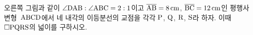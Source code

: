 \noindent\begin{minipage}[t]{0.58\linewidth}\vspace{0pt}\raggedright 오른쪽 그림과 같이 $\angle\mathrm{DAB}:\angle\mathrm{ABC}=2:1$이고 $\overline{\mathrm{AB}}=8\,\mathrm{cm}$, $\overline{\mathrm{BC}}=12\,\mathrm{cm}$인 평행사변형~$\mathrm{ABCD}$에서 네 내각의 이등분선의 교점을 각각 $\mathrm{P}$, $\mathrm{Q}$, $\mathrm{R}$, $\mathrm{S}$라 하자. 이때 $\square\mathrm{PQRS}$의 넓이를 구하시오.\end{minipage}\hfill\begin{minipage}[t]{0.4\linewidth}\vspace{0pt}\centering \resizebox{\ifdim\width>\linewidth\linewidth\else\width\fi}{!}{}\end{minipage}\par
